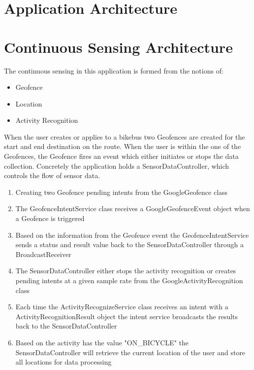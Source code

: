 

\section{Application Architecture}


\section{Continuous Sensing Architecture}

The continuous sensing in this application is formed from the notions of:
\begin{itemize}
    \item Geofence 
    \item Location 
    \item Activity Recognition
\end{itemize}

When the user creates or applies to a bikebus two Geofences are created for the start and end destination on the route. When the user is within the one of the Geofences, the Geofence fires an event which either initiates or stops the data collection.
Concretely the application holds a SensorDataController, which controls the flow of sensor data. 
\begin{enumerate}
    \item Creating two Geofence pending intents from the GoogleGeofence class
    \item The GeofenceIntentService class receives a GoogleGeofenceEvent object when a Geofence is triggered
    \item Based on the information from the Geofence event the GeofenceIntentService sends a status and result value back to the SensorDataController through a BroadcastReceiver
    \item The SensorDataController either stops the activity recognition or creates pending intents at a given sample rate from the GoogleActivityRecognition class
    \item Each time the ActivityRecognizeService class receives an intent with a ActivityRecognitionResult object the intent service broadcasts the results back to the SensorDataController
    \item Based on the activity has the value "ON\_BICYCLE" the SensorDataController will retrieve the current location of the user and store all locations for data processing
\end{enumerate}

